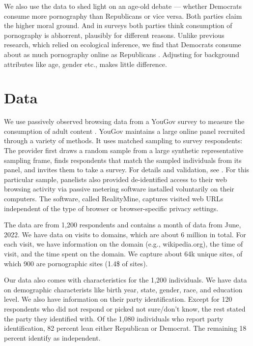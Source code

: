 \documentclass[12pt, letterpaper]{article}
\begin{document}
We also use the data to shed light on an age-old debate --- whether Democrats consume more pornography than Republicans or vice versa. Both parties claim the higher moral ground. And in surveys both parties think consumption of pornography is abhorrent, plausibly for different reasons. Unlike previous research, which relied on ecological inference, we find that Democrats consume about as much pornography online as Republicans \citep{macinnis2015american, edelman2009markets}. Adjusting for background attributes like age, gender etc., makes little difference.

\section*{Data}\label{sec:data}
We use passively observed browsing data from a YouGov survey to measure the consumption of adult content \citep{data-dataverse}. YouGov maintains a large online panel recruited through a variety of methods. It uses matched sampling to survey respondents: The provider first draws a random sample from a large synthetic representative sampling frame, finds respondents that match the sampled individuals from its panel, and invites them to take a survey. For details and validation, see \citet{rivers2009}. For this particular sample, panelists also provided de-identified access to their web browsing activity via passive metering software installed voluntarily on their computers. The software, called RealityMine, captures visited web URLs independent of the type of browser or browser-specific privacy settings. 

The data are from 1,200 respondents and contains a month of data from June, 2022.  We have data on visits to domains, which are about 6 million in total. For each visit, we have information on the domain (e.g., wikipedia.org), the time of visit, and the time spent on the domain. 
We capture about 64k unique sites, of which 900 are pornographic sites (1.4\$ of sites). 

Our data also comes with characteristics for the 1,200 individuals. We have data on demographic characterists like birth year, state, gender, race, and education level. We also have information on their party identification. Except for 120 respondents  who did not respond or picked not sure/don't know, the rest stated the party they identified with.  Of the 1,080 individuals who report party identification, 82 percent lean either Republican or Democrat. The remaining 18 percent identify as independent. 
\end{document}
